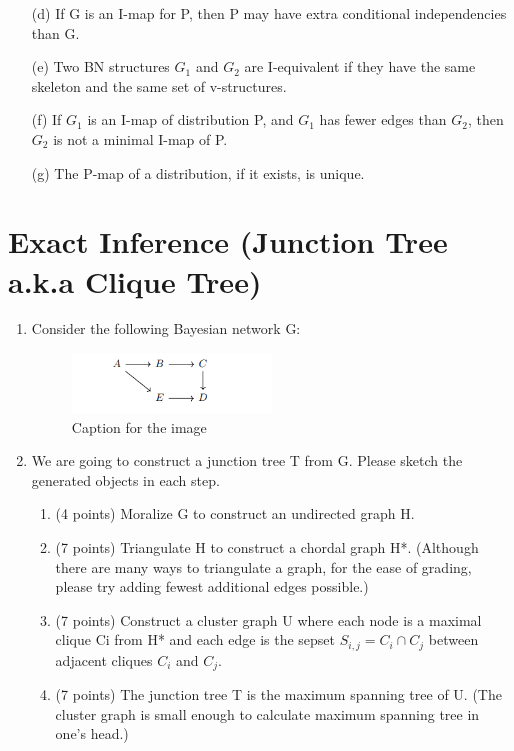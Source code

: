 \documentclass[a3paper,12pt]{extarticle} %
\begin{document}
\begin{enumerate}
\begin{enumerate}
        \item[(d)] If G is an I-map for P, then P may have extra conditional independencies than G.
        \item[(e)] Two BN structures $G_1$ and $G_2$ are I-equivalent if they have the same skeleton and the same set of v-structures.
        \item[(f)] If $G_1$ is an I-map of distribution P, and $G_1$ has fewer edges than $G_2$, then $G_2$ is not a minimal I-map of P.
        \item[(g)] The P-map of a distribution, if it exists, is unique.
    \end{enumerate}
\end{enumerate}
\newpage
\section{Exact Inference (Junction Tree a.k.a Clique Tree)}
\begin{enumerate}
    \item Consider the following Bayesian network G:
    \begin{figure}[h!]
        \centering
        \includegraphics[width=0.5\textwidth]{junction_tree.png}
        \caption{Caption for the image}
        \label{fig:example_image}
    \end{figure}
    \item We are going to construct a junction tree T from G. Please sketch the generated objects in each step.
    \begin{enumerate}
        \item (4 points) Moralize G to construct an undirected graph H.
        \item (7 points) Triangulate H to construct a chordal graph H*.
        (Although there are many ways to triangulate a graph, for the ease of grading, please try adding fewest
        additional edges possible.)
        \item (7 points) Construct a cluster graph U where each node is a maximal clique Ci from H* and each edge is the sepset \(S_{i,j} = C_i \cap C_j\) between adjacent cliques \(C_i\) and \(C_j\).
        \item (7 points) The junction tree T is the maximum spanning tree of U.
        (The cluster graph is small enough to calculate maximum spanning tree in one’s head.)
    \end{enumerate}

\end{enumerate}
\newpage
\end{document}
